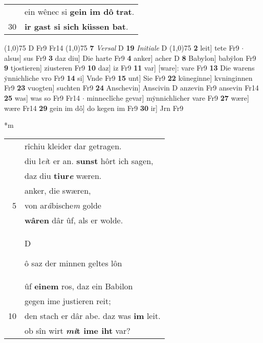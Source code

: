 \documentclass[8pt,a4paper,notitlepage]{article}
\begin{document}
\begin{table}[ht]
\begin{minipage}[t]{0.5\linewidth}
\begin{tabular}{rl}
 & ein wênec si \textbf{gein im dô} \textbf{trat}.\\ 
30 & \textbf{ir gast si sich küssen bat}.\\ 
\end{tabular}
\scriptsize
\line(1,0){75} \newline
D Fr9 Fr14 \newline
\line(1,0){75} \newline
\textbf{7} \textit{Versal} D  \textbf{19} \textit{Initiale} D  \newline
\line(1,0){75} \newline
\textbf{2} leit] tete Fr9  $\cdot$ alsus] sus Fr9 \textbf{3} daz diu] Die harte Fr9 \textbf{4} anker] acher D \textbf{8} Babylon] babẏlon Fr9 \textbf{9} tjostieren] ziusteren Fr9 \textbf{10} daz] iz Fr9 \textbf{11} var] [ware]: vare Fr9 \textbf{13} Die warens ẏnnichliche vro Fr9 \textbf{14} si] Vnde Fr9 \textbf{15} unt] Sie Fr9 \textbf{22} küneginne] kvninginnen Fr9 \textbf{23} vuogten] suchten Fr9 \textbf{24} Anschevin] Anscivin D anzevin Fr9 ansevin Fr14 \textbf{25} was] was so Fr9 Fr14  $\cdot$ minneclîche gevar] mẏnnichlicher vare Fr9 \textbf{27} wære] wære Fr14 \textbf{29} gein im dô] do kegen im Fr9 \textbf{30} ir] Jrn Fr9 \newline
\end{minipage}
\hspace{0.5cm}
\begin{minipage}[t]{0.5\linewidth}
\small
\begin{center}*m
\end{center}
\begin{tabular}{rl}
 & rîchiu kleider dar getragen.\\ 
 & diu l\textit{ei}t er an. \textbf{sunst} hôrt ich sagen,\\ 
 & daz diu \textbf{tiur\textit{e}} wæren.\\ 
 & anker, die swæren,\\ 
5 & von ar\textit{â}bische\textit{m} golde\\ 
 & \textbf{wâren} dâr ûf, als er wolde.\\ 
 & \begin{large}D\end{large}ô saz der minnen geltes lôn\\ 
 & ûf \textbf{einem} ros, daz ein Babilon\\ 
 & gegen ime justieren reit;\\ 
10 & den stach er dâr abe. daz was \textbf{im} leit.\\ 
 & ob sîn wirt \textbf{\textit{mi}t ime iht} var?\\ 

\end{tabular}
\end{minipage}
\end{table}
\end{document}
